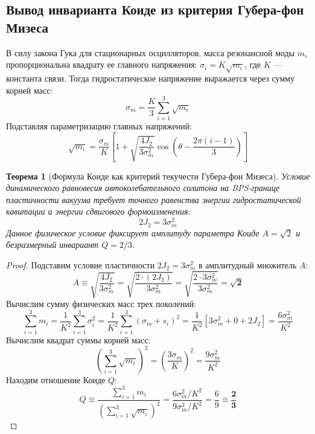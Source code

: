 \documentclass[12pt,a4paper]{article}
\newtheorem{theorem}{Теорема}
\begin{document}
	\subsection{Вывод инварианта Коиде из критерия Губера-фон Мизеса}
	В силу закона Гука для стационарных осцилляторов, масса резонансной моды $m_i$ пропорциональна квадрату ее главного напряжения: $\sigma_i = K \sqrt{m_i}$, где $K$ — константа связи. Тогда гидростатическое напряжение выражается через сумму корней масс:
	\begin{equation}
		\sigma_m = \frac{K}{3} \sum_{i=1}^3 \sqrt{m_i}
	\end{equation}
	Подставляя параметризацию главных напряжений:
	\begin{equation}
		\sqrt{m_i} = \frac{\sigma_m}{K} \left[ 1 + \sqrt{\frac{4 J_2}{3 \sigma_m^2}} \cos\left( \theta - \frac{2\pi(i-1)}{3} \right) \right]
	\end{equation}
	
	\begin{theorem}[Формула Коиде как критерий текучести Губера-фон Мизеса]
		Условие динамического равновесия автоколебательного солитона на BPS-границе пластичности вакуума требует точного равенства энергии гидростатической кавитации и энергии сдвигового формоизменения:
		\begin{equation}
			2 J_2 = 3 \sigma_m^2
		\end{equation}
		Данное физическое условие фиксирует амплитуду параметра Коиде $A = \sqrt{2}$ и безразмерный инвариант $Q = 2/3$.
	\end{theorem}
	
	\begin{proof}
		Подставим условие пластичности $2 J_2 = 3 \sigma_m^2$ в амплитудный множитель $A$:
		\begin{equation}
			A \equiv \sqrt{\frac{4 J_2}{3 \sigma_m^2}} = \sqrt{\frac{2 \cdot (2 J_2)}{3 \sigma_m^2}} = \sqrt{\frac{2 \cdot 3 \sigma_m^2}{3 \sigma_m^2}} = \mathbf{\sqrt{2}}
		\end{equation}
		Вычислим сумму физических масс трех поколений:
		\begin{equation}
			\sum_{i=1}^3 m_i = \frac{1}{K^2} \sum_{i=1}^3 \sigma_i^2 = \frac{1}{K^2} \sum_{i=1}^3 (\sigma_m + s_i)^2 = \frac{1}{K^2} \left[ 3 \sigma_m^2 + 0 + 2 J_2 \right] = \frac{6 \sigma_m^2}{K^2}
		\end{equation}
		Вычислим квадрат суммы корней масс:
		\begin{equation}
			\left( \sum_{i=1}^3 \sqrt{m_i} \right)^2 = \left( \frac{3 \sigma_m}{K} \right)^2 = \frac{9 \sigma_m^2}{K^2}
		\end{equation}
		Находим отношение Коиде $Q$:
		\begin{equation}
			Q \equiv \frac{\sum_{i=1}^3 m_i}{\left( \sum_{i=1}^3 \sqrt{m_i} \right)^2} = \frac{6 \sigma_m^2 / K^2}{9 \sigma_m^2 / K^2} = \frac{6}{9} \equiv \mathbf{\frac{2}{3}}
		\end{equation}
	\end{proof}
	
\end{document}
